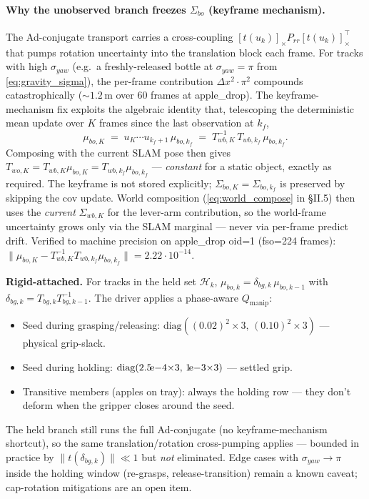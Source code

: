 \documentclass[11pt]{article}
\begin{document}
\paragraph{Why the unobserved branch freezes $\Sigma_{bo}$ (keyframe
mechanism).}
The Ad-conjugate transport carries a cross-coupling
$[t(u_k)]_\times P_{rr}[t(u_k)]_\times^\top$ that pumps rotation
uncertainty into the translation block each frame. For tracks with
high $\sigma_{yaw}$ (e.g.\ a freshly-released bottle at
$\sigma_{yaw}=\pi$ from \eqref{eq:gravity_sigma}), the per-frame
contribution $\Delta x^2\!\cdot\!\pi^2$ compounds catastrophically
($\sim 1.2\,$m over 60 frames at apple\_drop). The keyframe-mechanism
fix exploits the algebraic identity that, telescoping the
deterministic mean update over $K$ frames since the last observation
at $k_f$,
\begin{equation}\label{eq:telescope}
\mu_{bo,K} \;=\; u_K \cdots u_{k_f+1}\,\mu_{bo,k_f}
            \;=\; T_{wb,K}^{-1}\,T_{wb,k_f}\,\mu_{bo,k_f}.
\end{equation}
Composing with the current SLAM pose then gives
$T_{wo,K}=T_{wb,K}\mu_{bo,K}=T_{wb,k_f}\mu_{bo,k_f}$ — \emph{constant}
for a static object, exactly as required. The keyframe is not stored
explicitly; $\Sigma_{bo,K}=\Sigma_{bo,k_f}$ is preserved by skipping
the cov update. World composition (\eqref{eq:world_compose} in §II.5)
then uses the \emph{current} $\Sigma_{wb,K}$ for the lever-arm
contribution, so the world-frame uncertainty grows only via the SLAM
marginal — never via per-frame predict drift. Verified to machine
precision on apple\_drop oid=1 (fso=224 frames):
$\|\mu_{bo,K} - T_{wb,K}^{-1}T_{wb,k_f}\mu_{bo,k_f}\|=2.22\!\cdot\!10^{-14}$.

\textbf{Rigid-attached.} For tracks in the held set $\mathcal{H}_k$,
$\mu_{bo,k} = \delta_{bg,k}\,\mu_{bo,k-1}$ with
$\delta_{bg,k} = T_{bg,k}T_{bg,k-1}^{-1}$. The driver applies a
phase-aware $Q_{\text{manip}}$:
\begin{itemize}
\item Seed during grasping/releasing: $\mathrm{diag}((0.02)^2{\times}3,\,(0.10)^2{\times}3)$ — physical grip-slack.
\item Seed during holding: $\mathrm{diag}(2.5\!{\rm e}{-4}{\times}3,\,1\!{\rm e}{-3}{\times}3)$ — settled grip.
\item Transitive members (apples on tray): always the holding row — they don't deform when the gripper closes around the seed.
\end{itemize}
The held branch still runs the full Ad-conjugate (no
keyframe-mechanism shortcut), so the same translation/rotation
cross-pumping applies — bounded in practice by
$\|t(\delta_{bg,k})\|\!\ll\!1$ but \emph{not} eliminated. Edge cases
with $\sigma_{yaw}\!\to\!\pi$ inside the holding window
(re-grasps, release-transition) remain a known caveat; cap-rotation
mitigations are an open item.
\end{document}
